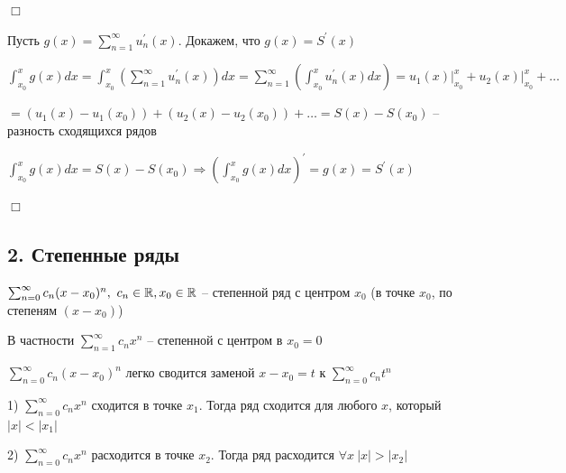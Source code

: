 \documentclass[12pt]{article}
\begin{document}
    
    \begin{MyProof}
        $\Box$

        Пусть $g(x) = \sum_{n = 1}^\infty u^\prime_n(x)$. Докажем, что $g(x) = S^\prime(x)$

        $\int_{x_0}^x g(x)dx = \int_{x_0}^x \left(\sum_{n = 1}^\infty u^\prime_n(x)\right) dx = \sum_{n = 1}^\infty 
        \left(\int_{x_0}^x u_n^\prime (x)dx\right) = u_1(x) \Big|_{x_0}^x + u_2(x) \Big|_{x_0}^x + \dots$

        $ = (u_1(x) - u_1(x_0)) + (u_2(x) - u_2(x_0)) + \dots = S(x) - S(x_0)$ -- разность сходящихся рядов

        $\int_{x_0}^x g(x) dx = S(x) - S(x_0) \Longrightarrow \left(\int_{x_0}^x g(x) dx\right)^\prime = g(x) = S^\prime(x)$

        $\Box$
    \end{MyProof}

    \subsection{2. Степенные ряды}

    \hypertarget{powerseries}{}

    \Def $\sum_{n = 0}^\infty c_n(x - x_0)^n, \ c_n \in \mathbb{R}, x_0 \in \mathbb{R}$ -- степенной ряд с центром $x_0$ (в точке $x_0$, по степеням $(x - x_0)$)

    \Nota В частности $\sum_{n = 1}^\infty c_n x^n$ -- степенной с центром в $x_0 = 0$

    $\sum_{n = 0}^\infty c_n(x - x_0)^n$ легко сводится заменой $x - x_0 = t$ к $\sum_{n = 0}^\infty c_n t^n$

    \hypertarget{abelstheorem}{}

    \begin{MyTheorem}

        1) $\sum_{n = 0}^\infty c_n x^n$ сходится в точке $x_1$. Тогда ряд сходится для любого $x$, который $|x| < |x_1|$

        2) $\sum_{n = 0}^\infty c_n x^n$ расходится в точке $x_2$. Тогда ряд расходится $\forall x \ |x| > |x_2|$
    \end{MyTheorem}
\end{document}
